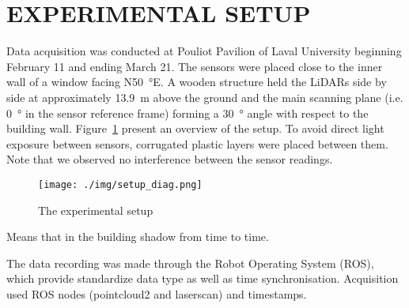 \section{EXPERIMENTAL SETUP}
Data acquisition was conducted at Pouliot Pavilion of Laval University beginning February 11 and ending March 21. The sensors were placed close to the inner wall of a window facing N\SI{50}{\degree}E. A wooden structure held the LiDARs side by side at approximately \SI{13.9}{\meter} above the ground and the main scanning plane (i.e. \SI{0}{\degree} in the sensor reference frame) forming a \SI{30}{\degree} angle with respect to the building wall. Figure~\ref{fig:setup} present an overview of the setup. To avoid direct light exposure between sensors, corrugated plastic layers were placed between them. Note that we observed no interference between the sensor readings.

\begin{figure}[h]
    \centering
    \texttt{[image: ./img/setup\_diag.png]}
    \caption{The experimental setup}
    \label{fig:setup}
\end{figure}

Means that in the building shadow from time to time.

The data recording was made through the Robot Operating System (ROS), which provide standardize data type as well as time synchronisation. Acquisition used ROS nodes (pointcloud2 and laserscan) and timestamps.


